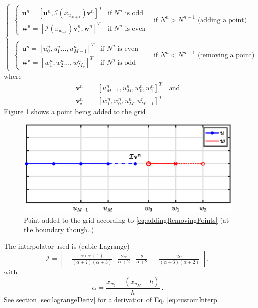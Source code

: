 \documentclass[dvipsnames]{article}
\def\u{\mathbf{u}}
\begin{document}
\begin{equation}\label{eq:addingRemovingPoints}
    \begin{cases}
        \begin{cases}\u^n = [\u^n, \mathcal{I}(x_{u_{M+1}})\mathbf{v}^n]^T & \text{if $N^n$ is odd}\\
        \mathbf{w}^n = [\mathcal{I}(x_{w_{-1}})\mathbf{v}_\star^n, \mathbf{w}^n]^T & \text{if $N^n$ is even}
        \end{cases} & \text{if } N^n > N^{n-1} \text{ (adding a point)}\\
        \\
        \begin{cases}
        \u^n = [u_0^n, u_1^n ..., u_{M-1}^n]^T & \text{if $N^n$ is even} \\
         \mathbf{w}^n = [w_1^n, w_2^n ..., w_{M_w}^n]^T & \text{if $N^n$ is odd} 
        \end{cases} &\text{if } N^n < N^{n-1} \text{ (removing a point)}
    \end{cases}
\end{equation}
where
\begin{align}
    \mathbf{v}^n &= [u_{M-1}^n, u_M^n, w_0^n, w_1^n]^T \quad \text{and}\\
    \mathbf{v}_\star^n &= [w_1^n, w_0^n, u_M^n, u_{M-1}^n]^T
\end{align}
Figure \ref{fig:addingPoint} shows a point being added to the grid
\begin{figure}[h]
\centerline{\includegraphics[width=0.6\columnwidth]{addingPoint.eps} }
\caption{\label{fig:addingPoint}{Point added to the grid according to \eqref{eq:addingRemovingPoints} (at the boundary though..)}}   
\end{figure}

The interpolator used is (cubic Lagrange)
\begin{equation}\label{eq:customInterp}
    \mathcal{I} = \begin{bmatrix} -\frac{\alpha(\alpha+1)}{(\alpha+2)(\alpha+3)} &\frac{2\alpha}{\alpha+2} &\frac{2}{\alpha+2} 
    &-\frac{2\alpha}{(\alpha+3)(\alpha+2)}
    \end{bmatrix},
\end{equation}
with
\begin{equation}
    \alpha = \frac{x_{w_0} - (x_{u_M} + h)}{h}\ .
\end{equation}
See section \ref{sec:lagrangeDeriv} for a derivation of Eq. \eqref{eq:customInterp}.
\end{document}
